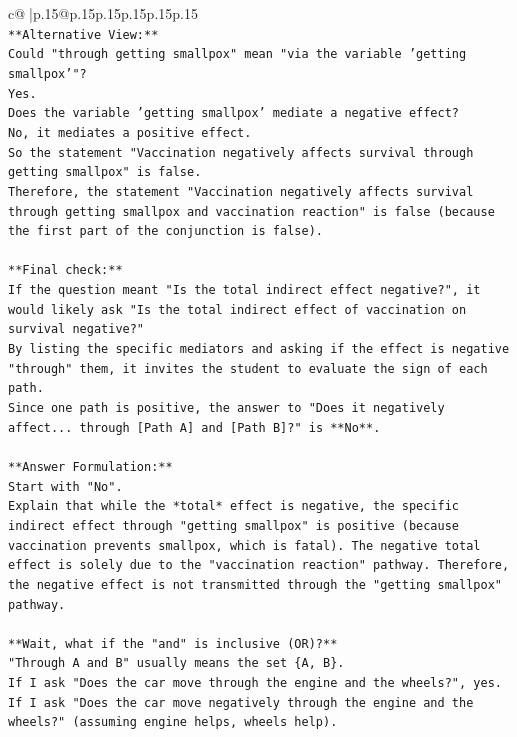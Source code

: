 \documentclass{article}
\begin{document}
{\begin{supertabular}{c@{$\;$}|p{.15\linewidth}@{}p{.15\linewidth}p{.15\linewidth}p{.15\linewidth}p{.15\linewidth}p{.15\linewidth}}
{{{\\ 
\texttt{**Alternative View:**} \\
\texttt{Could "through getting smallpox" mean "via the variable 'getting smallpox'"?} \\
\texttt{Yes.} \\
\texttt{Does the variable 'getting smallpox' mediate a negative effect?} \\
\texttt{No, it mediates a positive effect.} \\
\texttt{So the statement "Vaccination negatively affects survival through getting smallpox" is false.} \\
\texttt{Therefore, the statement "Vaccination negatively affects survival through getting smallpox and vaccination reaction" is false (because the first part of the conjunction is false).} \\
\\ 
\texttt{**Final check:**} \\
\texttt{If the question meant "Is the total indirect effect negative?", it would likely ask "Is the total indirect effect of vaccination on survival negative?"} \\
\texttt{By listing the specific mediators and asking if the effect is negative "through" them, it invites the student to evaluate the sign of each path.} \\
\texttt{Since one path is positive, the answer to "Does it negatively affect... through {[}Path A{]} and {[}Path B{]}?" is **No**.} \\
\\ 
\texttt{**Answer Formulation:**} \\
\texttt{Start with "No".} \\
\texttt{Explain that while the *total* effect is negative, the specific indirect effect through "getting smallpox" is positive (because vaccination prevents smallpox, which is fatal). The negative total effect is solely due to the "vaccination reaction" pathway. Therefore, the negative effect is not transmitted through the "getting smallpox" pathway.} \\
\\ 
\texttt{**Wait, what if the "and" is inclusive (OR)?**} \\
\texttt{"Through A and B" usually means the set \{A, B\}.} \\
\texttt{If I ask "Does the car move through the engine and the wheels?", yes.} \\
\texttt{If I ask "Does the car move negatively through the engine and the wheels?" (assuming engine helps, wheels help).} \\
}}}
\end{supertabular}}
\end{document}
